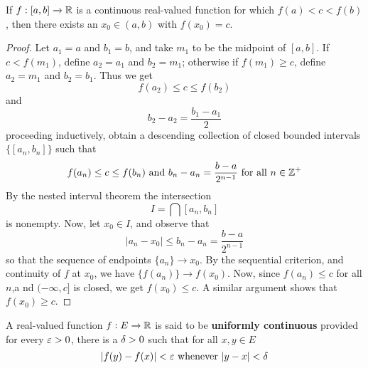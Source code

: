 \begin{theorem}\label{1.4.4}
    If $f:[a,b] \xrightarrow{} \mathbb{R}$ is a continuous real-valued function for
    which $f(a)<c<f(b)$, then there exists an $x_0 \in (a,b)$ with $f(x_0)=c$.
\end{theorem}
\begin{proof}
    Let $a_1=a$ and $b_1=b$, and take $m_1$ to be the midpoint of $[a,b]$. If
    $c<f(m_1)$, define $a_2=a_1$ and $b_2=m_1$; otherwise if $f(m_1) \geq c$,
    define $a_2=m_1$ and $b_2=b_1$. Thus we get
    \begin{equation*}
        f(a_2) \leq c \leq f(b_2)
    \end{equation*}
    and
    \begin{equation*}
        b_2-a_2=\frac{b_1-a_1}{2}
    \end{equation*}
    proceeding inductively, obtain a descending collection of closed bounded
    intervals $\{[a_n,b_n]\}$ such that
    \begin{equation*}
        f(a_n) \leq c \leq f(b_n) \text{ and } b_n-a_n=\frac{b-a}{2^{n-1}}
        \text{ for all } n \in \mathbb{Z}^+
    \end{equation*}
    By the nested interval theorem the intersection
    \begin{equation*}
        I=\bigcap{[a_n,b_n]}
    \end{equation*}
    is nonempty. Now, let $ x_0 \in I$, and observe that
    \begin{equation*}
        |a_n-x_0| \leq b_n-a_n=\frac{b-a}{2^{n-1}}
    \end{equation*}
    so that the sequence of endpoints $\{a_n\} \xrightarrow{} x_0$. By the
    sequential criterion, and continuity of $f$ at  $x_0$, we have $\{f(a_n)\}
    \xrightarrow{} f(x_0)$. Now, since $f(a_n) \leq c$ for all $n$,a nd
    $(-\infty,c]$ is closed, we get $f(x_0) \leq c$. A similar argument shows
    that $f(x_0) \geq c$.
\end{proof}

\begin{definition}
    A real-valued function $f:E \xrightarrow{} \mathbb{R}$ is said to be
    \textbf{uniformly continuous} provided for every $\varepsilon>0$, there is a  $\delta>0$
    such that for all  $x,y \in E$
    \begin{equation*}
        |f(y)-f(x)|<\varepsilon \text{ whenever } |y-x|<\delta
    \end{equation*}
\end{definition}

